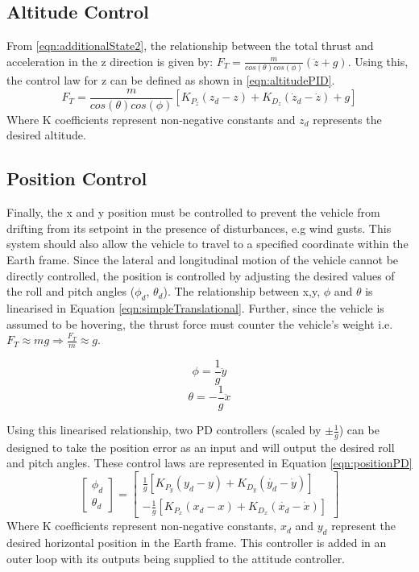 \FloatBarrier
\subsection{Altitude Control}
From \eqref{eqn:additionalState2}, the relationship between the total thrust and acceleration in the z direction is given by: $F_T= \frac{m}{cos(\theta)cos(\phi)}(\ddot{z}+g)$. Using this, the control law for z can be defined as shown in \eqref{eqn:altitudePID}.
\begin{equation}\label{eqn:altitudePID}
F_{T}=\frac{m}{cos(\theta)cos(\phi)}[K_{P_{z}}(z_{d}-z)+K_{D_{z}}(\dot{z}_{d}-\dot{z})+g]
\end{equation}
Where K coefficients represent non-negative constants and $z_{d}$ represents the desired altitude.
 
\FloatBarrier
\subsection{Position Control}
Finally, the x and y position must be controlled to prevent the vehicle from drifting from its setpoint in the presence of disturbances, e.g wind gusts. This system should also allow the vehicle to travel to a specified coordinate within the Earth frame. Since the lateral and longitudinal motion of the vehicle cannot be directly controlled, the position is controlled by adjusting the desired values of the roll and pitch angles ($\phi_{d}$, $\theta_{d}$).
The relationship between x,y, $\phi$ and $\theta$ is linearised in Equation \ref{eqn:simpleTranslational}. Further, since the vehicle is assumed to be hovering, the thrust force must counter the vehicle's weight i.e. $F_{T}\approx mg \Rightarrow \frac{F_{T}}{m}\approx g$. 

\[\phi=\frac{1}{g}\ddot{y}\]
\[\theta=-\frac{1}{g}\ddot{x}\]

Using this linearised relationship, two PD controllers (scaled by $\pm\frac{1}{g}$) can be designed to take the position error as an input and will output the desired roll and pitch angles. These control laws are represented in Equation \ref{eqn:positionPD}
\begin{equation}\label{eqn:positionPD}
\begin{bmatrix}
\phi_{d}\\\theta_{d}
\end{bmatrix}
=
\begin{bmatrix}
\frac{1}{g}[K_{P_{y}}(y_{d}-y)+K_{D_{y}}(\dot{y_{d}}-\dot{y})]\\
-\frac{1}{g}[K_{P_{x}}(x_{d}-x)+K_{D_{x}}(\dot{x_{d}}-\dot{x})]
\end{bmatrix}
\end{equation}
Where K coefficients represent non-negative constants, $x_{d}$ and $y_{d}$ represent the desired horizontal position in the Earth frame. This controller is added in an outer loop with its outputs being supplied to the attitude controller. 

